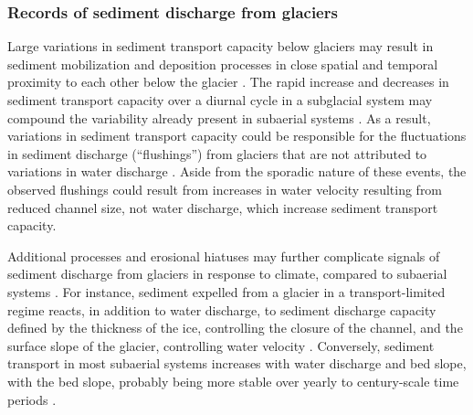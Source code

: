 \documentclass[11pt]{article}
\begin{document}
\begin{spacing}{1}
  
  \subsubsection{Records of sediment discharge  from glaciers}
  
  Large variations in sediment transport capacity below glaciers may result in sediment mobilization and deposition processes in close spatial and temporal proximity to each other below the glacier \citep{gimbert2016,perolo2018}.
  The rapid increase and decreases in sediment transport capacity over a diurnal cycle in a subglacial system may compound the variability already present in subaerial systems \citep{williams1989,jerolmack2010}.
  As a result, variations in sediment transport capacity could be responsible for the fluctuations in sediment discharge (``flushings'') from glaciers that are not attributed to variations in water discharge \citep[e.g.][]{richards2003,swift2021}.
  Aside from the sporadic nature of these events, the observed flushings could result from increases in water velocity resulting from reduced channel size, not water discharge, which increase sediment transport capacity.

  Additional processes and erosional hiatuses may further complicate signals of sediment discharge from glaciers in response to climate, compared to subaerial systems \citep{jansson2005,ganti2016}. 
  For instance, sediment expelled from a glacier in a transport-limited regime reacts, in addition to water discharge, to sediment discharge capacity defined by the thickness of the ice, controlling the closure of the channel, and the surface slope of the glacier, controlling water velocity \citep[Section~\ref{sect:sub_mode}; ] []{rothlisberger1972,shreve1972,delaney2022,stevens2022}.
  Conversely, sediment transport in most subaerial systems increases with water discharge and bed slope, with the bed slope, probably being more stable over yearly to century-scale time periods \citep[Section~\ref{sect:fluv}; e.g.][]{muller1968,whipple1999,wong2006,wickert2019}. 
   

\end{spacing}
\end{document}

